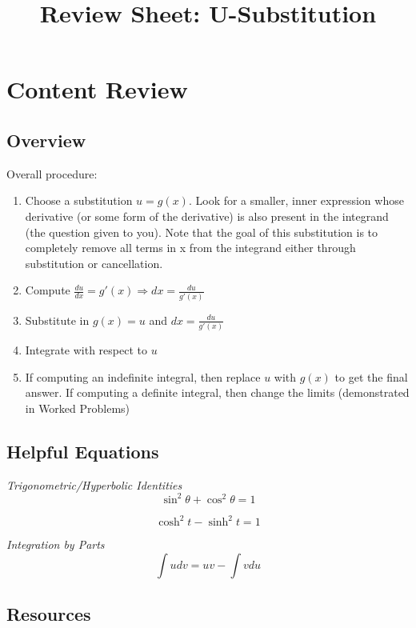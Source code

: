 \documentclass{article}
\title{Review Sheet: U-Substitution}
\date{}
\author{}
\begin{document}
\maketitle
\vspace{-0.75in}
\section*{Content Review}
\subsection*{Overview}

Overall procedure:
\begin{enumerate}
    \item Choose a substitution $u = g(x)$. Look for a smaller, inner expression whose derivative (or some form of the derivative) is also present in the integrand (the question given to you). Note that the goal of this substitution is to completely remove all terms in x from the integrand either through substitution or cancellation. 

    \item Compute $\frac{du}{dx} = g'(x) \Longrightarrow dx = \frac{du}{g'(x)}$

    \item Substitute in $g(x) = u$ and $dx = \frac{du}{g'(x)}$

    \item Integrate with respect to $u$

    \item If computing an indefinite integral, then replace $u$ with $g(x)$ to get the final answer. If computing a definite integral, then change the limits (demonstrated in Worked Problems)
\end{enumerate}

\subsection*{Helpful Equations}

\noindent\textit{Trigonometric/Hyperbolic Identities}
$$\sin^2\theta + \cos^2\theta = 1$$

$$\cosh^2 t - \sinh^2 t = 1$$

\noindent\textit{Integration by Parts}
$$\int{u dv} = uv - \int{v du}$$

\subsection*{Resources}
\end{document}
